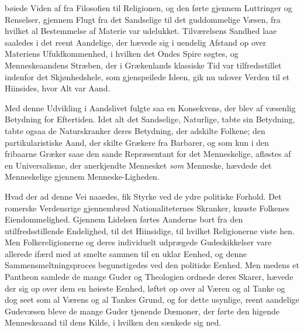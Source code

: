 \documentclass[12pt,a4paper,openany]{book}
\newcommand{\opage}[1]{\marginnote{\footnotesize\textit{[#1]}}}
\begin{document}
bøiede Viden af fra Filosofien til Religionen, og den førte
gjennem Luttringer og Renselser, gjennem Flugt fra det
Sandselige til det guddommelige Væsen, fra hvilket al Bestemmelse
af Materie var udelukket. Tilværelsens Sandhed
\opage{445}laae saaledes i det reent Aandelige, der hævede sig i uendelig
Afstand op over Materiens Ufuldkommenhed, i hvilken det
Ondes Spire søgtes, og Menneskeaandens Stræben, der i
Grækenlands klassiske Tid var tilfredsstillet indenfor det
Skjønhedshele, som gjenspeilede Ideen, gik nu udover Verden
til et Hiinsides, hvor Alt var Aand.

Med denne Udvikling i Aandslivet fulgte saa en Konsekvens,
der blev af væsenlig Betydning for Eftertiden. Idet
alt det Sandselige, Naturlige, tabte sin Betydning, tabte
ogsaa de Naturskranker deres Betydning, der adskilte Folkene;
den partikularistiske Aand, der skilte Grækere fra Barbarer, og
som kun i den fribaarne Græker saae den sande Repræsentant
for det Menneskelige, afløstes af en Universalisme, der anerkjendte
Mennesket \emph{som} Menneske, hævdede det Menneskelige
gjennem Menneske-Ligheden.

Hvad der ad denne Vei naaedes, fik Styrke ved de ydre
politiske Forhold. Det romerske Verdensrige gjennembrød
Nationaliteternes Skranker, knuste Folkenes Eiendommelighed.
Gjennem Lidelsen førtes Aanderne bort fra den utilfredsstillende
Endelighed, til det Hiinsidige, til hvilket Religionerne
viste hen. Men Folkereligionerne og deres individuelt udprægede
Gudeskikkelser vare allerede ifærd med at smelte
sammen til en uklar Eenhed, og denne Sammensmeltningsproces
begunstigedes ved den politiske Eenhed. Men medens
et Pantheon samlede de mange Guder og Theologien ordnede
deres Skarer, hævede der sig op over dem en høieste Eenhed,
løftet op over al Væren og al Tanke og dog seet som al
Værens og al Tankes Grund, og for dette usynlige, reent
aandelige Gudevæsen bleve de mange Guder tjenende Dæmoner,
der førte den higende Menneskeaand til dens Kilde, i hvilken
den sænkede sig ned.
\end{document}

